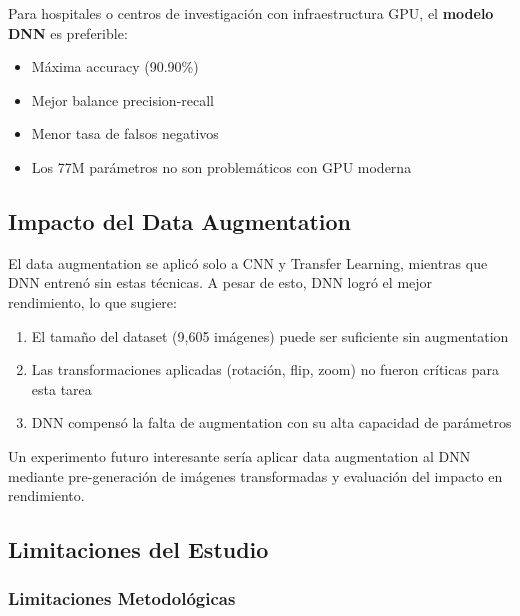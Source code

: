 \documentclass[11pt, a4paper]{article}
\begin{document}
Para hospitales o centros de investigación con infraestructura GPU, el \textbf{modelo DNN} es preferible:

\begin{itemize}
    \item Máxima accuracy (90.90\%)
    \item Mejor balance precision-recall
    \item Menor tasa de falsos negativos
    \item Los 77M parámetros no son problemáticos con GPU moderna
\end{itemize}

\subsection{Impacto del Data Augmentation}

El data augmentation se aplicó solo a CNN y Transfer Learning, mientras que DNN entrenó sin estas técnicas. A pesar de esto, DNN logró el mejor rendimiento, lo que sugiere:

\begin{enumerate}
    \item El tamaño del dataset (9,605 imágenes) puede ser suficiente sin augmentation
    \item Las transformaciones aplicadas (rotación, flip, zoom) no fueron críticas para esta tarea
    \item DNN compensó la falta de augmentation con su alta capacidad de parámetros
\end{enumerate}

Un experimento futuro interesante sería aplicar data augmentation al DNN mediante pre-generación de imágenes transformadas y evaluación del impacto en rendimiento.

\subsection{Limitaciones del Estudio}

\subsubsection{Limitaciones Metodológicas}
\end{document}
